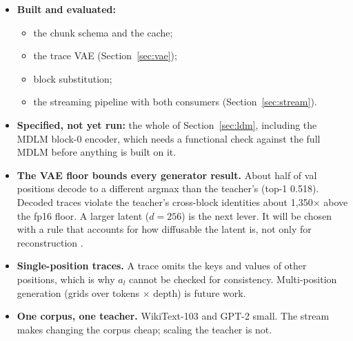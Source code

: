 \documentclass[11pt]{article}
\begin{document}
\begin{itemize}[leftmargin=1.5em]
  \item \textbf{Built and evaluated:}
    \begin{itemize}[leftmargin=1.2em]
      \item the chunk schema and the cache;
      \item the trace VAE (Section~\ref{sec:vae});
      \item block substitution;
      \item the streaming pipeline with both consumers (Section~\ref{sec:stream}).
    \end{itemize}
  \item \textbf{Specified, not yet run:} the whole of Section~\ref{sec:ldm}, including the MDLM block-0 encoder, which needs
    a functional check against the full MDLM before anything is built on it.
  \item \textbf{The VAE floor bounds every generator result.} About half of val positions decode to a different argmax than
    the teacher's (top-1 0.518). Decoded traces violate the teacher's cross-block identities about 1{,}350$\times$ above the
    fp16 floor. A larger latent ($d = 256$) is the next lever. It will be chosen with a rule that accounts for how
    diffusable the latent is, not only for reconstruction \citep{yao2025vavae,skorokhodov2025diffusability}.
  \item \textbf{Single-position traces.} A trace omits the keys and values of other positions, which is why $a_l$ cannot be
    checked for consistency. Multi-position generation (grids over tokens $\times$ depth) is future work.
  \item \textbf{One corpus, one teacher.} WikiText-103 and GPT-2 small. The stream makes changing the corpus cheap; scaling
    the teacher is not.
\end{itemize}
\end{document}
